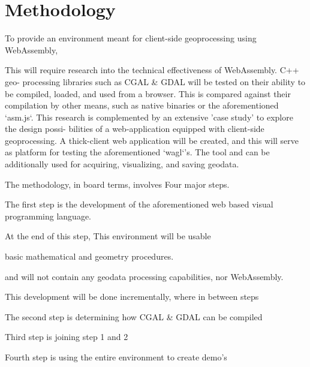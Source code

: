 
\section{Methodology}

To provide an environment meant for client-side geoprocessing using WebAssembly,


This will require research into the technical effectiveness of WebAssembly. C++ geo-
processing libraries such as CGAL \& GDAL will be tested on their ability to be compiled,
loaded, and used from a browser. This is compared against their compilation by other
means, such as native binaries or the aforementioned ‘asm.js‘.
This research is complemented by an extensive ’case study’ to explore the design possi-
bilities of a web-application equipped with client-side geoprocessing. A thick-client web
application will be created, and this will serve as platform for testing the aforementioned
‘wagl‘’s. The tool and can be additionally used for acquiring, visualizing, and saving
geodata.

The methodology, in board terms, involves Four major steps. 

The first step is the development of the aforementioned web based visual programming language. 

At the end of this step, This environment will be usable 

basic mathematical and geometry procedures. 

and will not contain any geodata processing capabilities, nor WebAssembly. 

This development will be done incrementally, where in between steps 



The second step is determining how CGAL \& GDAL can be compiled



Third step is joining step 1 and 2



Fourth step is using the entire environment to create demo's





% 
% 
